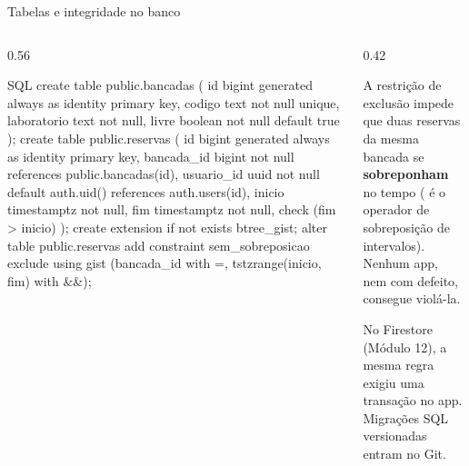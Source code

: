 \documentclass[aspectratio=169,10pt]{beamer}
\begin{document}
\begin{frame}[fragile]{Tabelas e integridade no banco}
  \begin{columns}[T]
    \begin{column}{0.56\textwidth}
\begin{codigo}[title=supabase/migrations/001\_reservas.sql]{SQL}
create table public.bancadas (
  id bigint generated always as identity primary key,
  codigo text not null unique,
  laboratorio text not null,
  livre boolean not null default true
);
create table public.reservas (
  id bigint generated always as identity primary key,
  bancada_id bigint not null references public.bancadas(id),
  usuario_id uuid not null default auth.uid()
             references auth.users(id),
  inicio timestamptz not null,
  fim    timestamptz not null,
  check (fim > inicio)
);
create extension if not exists btree_gist;
alter table public.reservas add constraint sem_sobreposicao
  exclude using gist (bancada_id with =,
                      tstzrange(inicio, fim) with &&);
\end{codigo}
    \end{column}
    \begin{column}{0.42\textwidth}
      \begin{conceito}
        A restrição de exclusão impede que duas reservas da mesma bancada se \textbf{sobreponham} no tempo (\cod{\&\&} é o operador de sobreposição de intervalos). Nenhum app, nem com defeito, consegue violá-la.
      \end{conceito}
      \begin{dica}
        No Firestore (Módulo 12), a mesma regra exigiu uma transação no app. Migrações SQL versionadas entram no Git.
      \end{dica}
    \end{column}
  \end{columns}
\end{frame}
\end{document}

